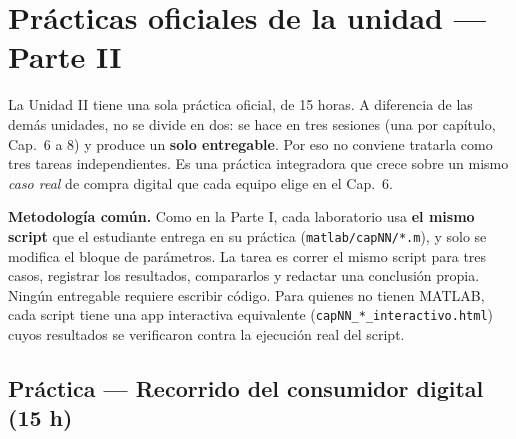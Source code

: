 \chapter*{Prácticas oficiales de la unidad — Parte II}

La Unidad II tiene una sola práctica oficial, de 15 horas. A diferencia de las
demás unidades, no se divide en dos: se hace en tres sesiones (una por
capítulo, Cap.~6 a 8) y produce un \textbf{solo entregable}. Por eso no
conviene tratarla como tres tareas independientes. Es una práctica
integradora que crece sobre un mismo \emph{caso real} de compra digital que
cada equipo elige en el Cap.~6.

\textbf{Metodología común.} Como en la Parte I, cada laboratorio usa
\textbf{el mismo script} que el estudiante entrega en su práctica
(\texttt{matlab/capNN/*.m}), y solo se modifica el bloque de parámetros. La
tarea es correr el mismo script para tres casos, registrar los resultados,
compararlos y redactar una conclusión propia. Ningún entregable requiere
escribir código. Para quienes no tienen MATLAB, cada script tiene una app
interactiva equivalente (\texttt{capNN\_*\_interactivo.html}) cuyos
resultados se verificaron contra la ejecución real del script.

\section*{Práctica — Recorrido del consumidor digital (15 h)}

